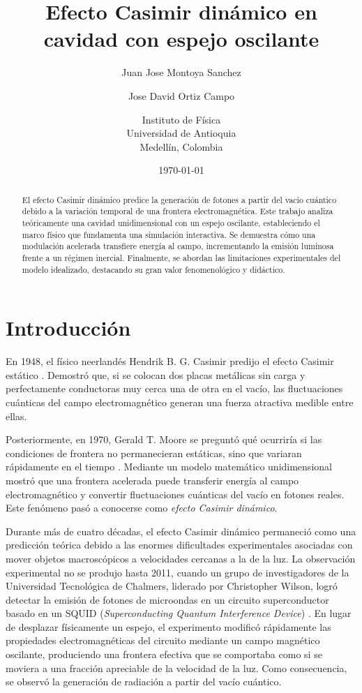\documentclass[11pt,a4paper]{article}
\title{Efecto Casimir dinámico en cavidad con espejo oscilante}
\author{
Juan Jose Montoya Sanchez \and Jose David Ortiz Campo\and
Instituto de Física\\
Universidad de Antioquia\\
Medellín, Colombia
}
\date{\today}
\begin{document}
\maketitle

\begin{abstract}
El efecto Casimir dinámico predice la generación de fotones a partir del vacío cuántico debido a la variación temporal de una frontera electromagnética. Este trabajo analiza teóricamente una cavidad unidimensional con un espejo oscilante, estableciendo el marco físico que fundamenta una simulación interactiva. Se demuestra cómo una modulación acelerada transfiere energía al campo, incrementando la emisión luminosa frente a un régimen inercial. Finalmente, se abordan las limitaciones experimentales del modelo idealizado, destacando su gran valor fenomenológico y didáctico.
\end{abstract}

\section{Introducción}

En 1948, el físico neerlandés Hendrik B. G. Casimir predijo el efecto Casimir estático \cite{casimir1948}. Demostró que, si se colocan dos placas metálicas sin carga y perfectamente conductoras muy cerca una de otra en el vacío, las fluctuaciones cuánticas del campo electromagnético generan una fuerza atractiva medible entre ellas.

Posteriormente, en 1970, Gerald T. Moore se preguntó qué ocurriría si las condiciones de frontera no permanecieran estáticas, sino que variaran rápidamente en el tiempo \cite{moore1970}. Mediante un modelo matemático unidimensional mostró que una frontera acelerada puede transferir energía al campo electromagnético y convertir fluctuaciones cuánticas del vacío en fotones reales. Este fenómeno pasó a conocerse como \emph{efecto Casimir dinámico}.

Durante más de cuatro décadas, el efecto Casimir dinámico permaneció como una predicción teórica debido a las enormes dificultades experimentales asociadas con mover objetos macroscópicos a velocidades cercanas a la de la luz. La observación experimental no se produjo hasta 2011, cuando un grupo de investigadores de la Universidad Tecnológica de Chalmers, liderado por Christopher Wilson, logró detectar la emisión de fotones de microondas en un circuito superconductor basado en un SQUID (\emph{Superconducting Quantum Interference Device}) \cite{wilson2011}. En lugar de desplazar físicamente un espejo, el experimento modificó rápidamente las propiedades electromagnéticas del circuito mediante un campo magnético oscilante, produciendo una frontera efectiva que se comportaba como si se moviera a una fracción apreciable de la velocidad de la luz. Como consecuencia, se observó la generación de radiación a partir del vacío cuántico.
\end{document}
